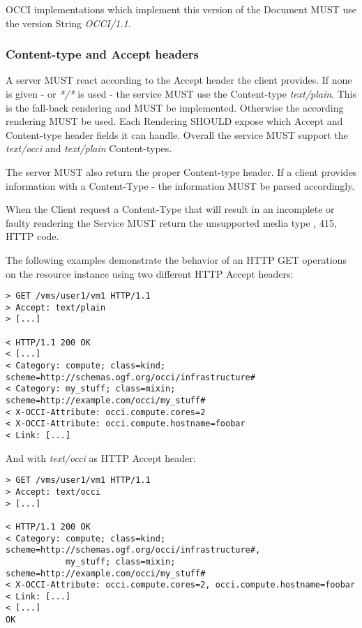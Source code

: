 \documentclass[10pt,a4paper]{article}
\begin{document}
OCCI implementations which implement this version of the Document MUST
use the version String \emph{OCCI/1.1}.

\subsubsection{Content-type and Accept headers}
\label{sec:content_type}
A server MUST react according to the Accept header the client
provides. If none is given - or \textit{*/*} is used - the service MUST
use the Content-type \emph{text/plain}. This is the fall-back
rendering and MUST be implemented. Otherwise the according rendering
MUST be used. Each Rendering SHOULD expose which Accept and
Content-type header fields it can handle. Overall the service MUST
support the \textit{text/occi} and \textit{text/plain} Content-types.

The server MUST also return the proper Content-type header. If a
client provides information with a Content-Type - the information MUST
be parsed accordingly.

When the Client request a Content-Type that will result in an
incomplete or faulty rendering the Service MUST return the unsupported
media type , 415, HTTP code.

The following examples demonstrate the behavior of an HTTP GET
operations on the resource instance \emph{} using two different HTTP
Accept headers:

\begin{verbatim}
> GET /vms/user1/vm1 HTTP/1.1
> Accept: text/plain
> [...]
 
< HTTP/1.1 200 OK
< [...]
< Category: compute; class=kind; scheme=http://schemas.ogf.org/occi/infrastructure#
< Category: my_stuff; class=mixin; scheme=http://example.com/occi/my_stuff#
< X-OCCI-Attribute: occi.compute.cores=2
< X-OCCI-Attribute: occi.compute.hostname=foobar
< Link: [...]
\end{verbatim}

And with \emph{text/occi} as HTTP Accept header:

\begin{verbatim}
> GET /vms/user1/vm1 HTTP/1.1
> Accept: text/occi
> [...]
 
< HTTP/1.1 200 OK
< Category: compute; class=kind; scheme=http://schemas.ogf.org/occi/infrastructure#,
            my_stuff; class=mixin; scheme=http://example.com/occi/my_stuff#
< X-OCCI-Attribute: occi.compute.cores=2, occi.compute.hostname=foobar
< Link: [...]
< [...]
OK
\end{verbatim}
\end{document}
